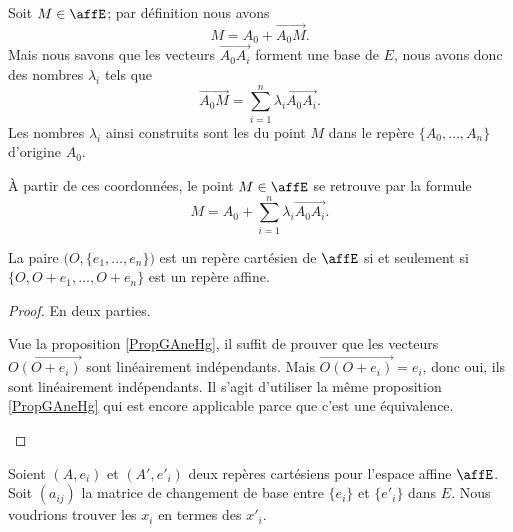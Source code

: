 Soit \( M\in \affE\); par définition nous avons
\begin{equation}
	M=A_0+\overrightarrow{ A_0M }.
\end{equation}
Mais nous savons que les vecteurs \( \overrightarrow{ A_0A_i }\) forment une base de \( E\), nous avons donc des nombres \( \lambda_i\) tels que
\begin{equation}
	\overrightarrow{ A_0M }=\sum_{i=1}^n\lambda_i\overrightarrow{ A_0A_i }.
\end{equation}
Les nombres \( \lambda_i\) ainsi construits sont les  du point \( M\) dans le repère \( \{ A_0,\ldots, A_n \}\) d'origine \( A_0\).

À partir de ces coordonnées, le point \( M\in\affE\) se retrouve par la formule
\begin{equation}
	M=A_0+\sum_{i=1}^n\lambda_i\overrightarrow{ A_0A_i }.
\end{equation}

\begin{proposition}      \label{PROPooIXVBooPpKsDE}
	La paire \( \big( O,\{ e_1,\ldots, e_n \} \big)\) est un repère cartésien de \( \affE\) si et seulement si \( \{ O,O+e_1,\ldots, O+e_n \}\) est un repère affine.
\end{proposition}

\begin{proof}
	En deux parties.
	\begin{subproof}
		Vue la proposition \ref{PropGAneHg}, il suffit de prouver que les vecteurs \( \overrightarrow{O(O+e_i)}\) sont linéairement indépendants. Mais \( \overrightarrow{O(O+e_i)}=e_i\), donc oui, ils sont linéairement indépendants.
		Il s'agit d'utiliser la même proposition \ref{PropGAneHg} qui est encore applicable parce que c'est une équivalence.
	\end{subproof}
\end{proof}

Soient \( (A,e_i)\) et \( (A',e'_i)\) deux repères cartésiens pour l'espace affine \( \affE\). Soit \( (a_{ij})\) la matrice de changement de base entre \( \{ e_i \}\) et \( \{ e'_i \}\) dans \( E\). Nous voudrions trouver les \( x_i\) en termes des \( x'_i\).

